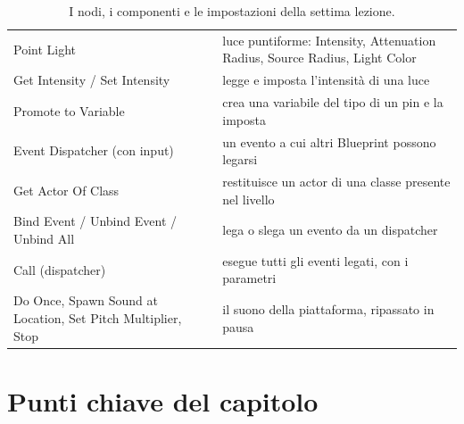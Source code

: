 \begin{table}[htbp]
\begin{tabular}{@{}p{4.4cm}p{9.6cm}@{}}
Point Light & luce puntiforme: Intensity, Attenuation Radius, Source Radius, Light
Color \\
Get Intensity / Set Intensity & legge e imposta l'intensità di una luce \\
Promote to Variable & crea una variabile del tipo di un pin e la imposta \\
Event Dispatcher (con input) & un evento a cui altri Blueprint possono legarsi \\
Get Actor Of Class & restituisce un actor di una classe presente nel livello \\
Bind Event / Unbind Event / Unbind All & lega o slega un evento da un dispatcher \\
Call (dispatcher) & esegue tutti gli eventi legati, con i parametri \\
Do Once, Spawn Sound at Location, Set Pitch Multiplier, Stop & il suono della
piattaforma, ripassato in pausa \\
\bottomrule
\end{tabular}
\caption{I nodi, i componenti e le impostazioni della settima lezione.}
\label{ue7:tab:nodi}
\end{table}

\section*{Punti chiave del capitolo}

